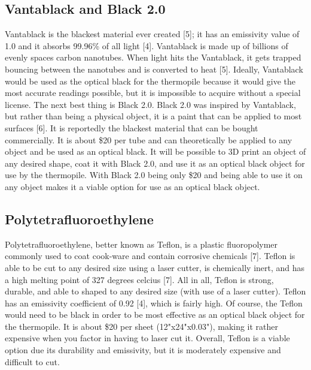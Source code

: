 \documentclass[10pt,draftclsnofoot,onecolumn,letterpaper]{article}
\begin{document}
\subsection{Vantablack and Black 2.0}
Vantablack is the blackest material ever created [5]; it has an emissivity value of 1.0 and it absorbs 99.96\% of all light [4]. Vantablack is made up of billions of evenly spaces carbon nanotubes. When light hits the Vantablack, it gets trapped bouncing between the nanotubes and is converted to heat [5]. Ideally, Vantablack would be used as the optical black for the thermopile because it would give the most accurate readings possible, but it is impossible to acquire without a special license. The next best thing is Black 2.0. Black 2.0 was inspired by Vantablack, but rather than being a physical object, it is a paint that can be applied to most surfaces [6]. It is reportedly the blackest material that can be bought commercially. It is about \$20 per tube and can theoretically be applied to any object and be used as an optical black. It will be possible to 3D print an object of any desired shape, coat it with Black 2.0, and use it as an optical black object for use by the thermopile. With Black 2.0 being only \$20 and being able to use it on any object makes it a viable option for use as an optical black object.

\subsection{Polytetrafluoroethylene}
Polytetrafluoroethylene, better known as Teflon, is a plastic fluoropolymer commonly used to coat cook-ware and contain corrosive chemicals [7]. Teflon is able to be cut to any desired size using a laser cutter, is chemically inert, and has a high melting point of 327 degrees celcius [7]. All in all, Teflon is strong, durable, and able to shaped to any desired size (with use of a laser cutter). Teflon has an emissivity coefficient of 0.92 [4], which is fairly high. Of course, the Teflon would need to be black in order to be most effective as an optical black object for the thermopile. It is about \$20 per sheet (12"x24"x0.03"), making it rather expensive when you factor in having to laser cut it. Overall, Teflon is a viable option due its durability and emissivity, but it is moderately expensive and difficult to cut.
\end{document}
